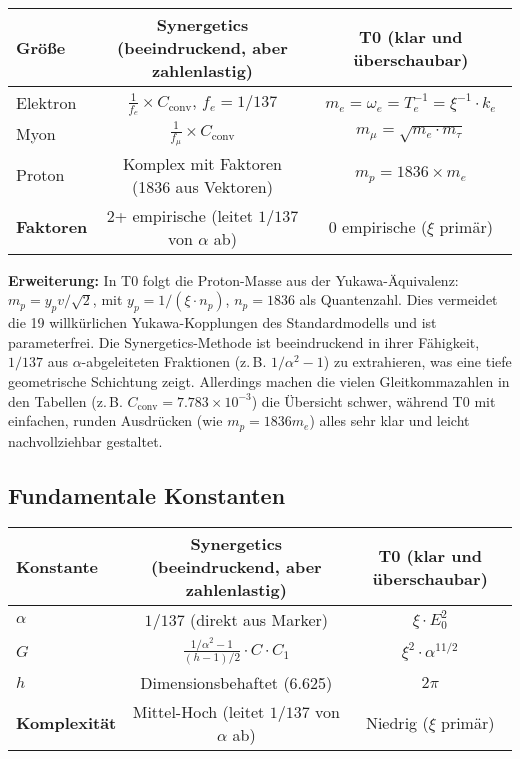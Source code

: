 \documentclass[12pt,a4paper]{article}
\newcommand{\xipar}{\xi}
\begin{document}
	\begin{center}
		\begin{tabular}{lcc}
			\toprule
			\textbf{Größe} & \textbf{Synergetics (beeindruckend, aber zahlenlastig)} & \textbf{T0 (klar und überschaubar)} \\
			\midrule
			Elektron & $\frac{1}{f_e} \times C_{\text{conv}}$, $f_e=1/137$ & $m_e = \omega_e = T_e^{-1} = \xipar^{-1} \cdot k_e$ \\
			Myon & $\frac{1}{f_\mu} \times C_{\text{conv}}$ & $m_\mu = \sqrt{m_e \cdot m_\tau}$ \\
			Proton & Komplex mit Faktoren (1836 aus Vektoren) & $m_p = 1836 \times m_e$ \\
			\midrule
			\textbf{Faktoren} & 2+ empirische (leitet $1/137$ von $\alpha$ ab) & 0 empirische ($\xipar$ primär) \\
			\bottomrule
		\end{tabular}
	\end{center}
	
	\textbf{Erweiterung:} In T0 folgt die Proton-Masse aus der Yukawa-Äquivalenz: $m_p = y_p v / \sqrt{2}$, mit $y_p = 1 / (\xipar \cdot n_p)$, $n_p = 1836$ als Quantenzahl. Dies vermeidet die 19 willkürlichen Yukawa-Kopplungen des Standardmodells und ist parameterfrei. Die Synergetics-Methode ist beeindruckend in ihrer Fähigkeit, $1/137$ aus $\alpha$-abgeleiteten Fraktionen (z.\,B. $1/\alpha^2 - 1$) zu extrahieren, was eine tiefe geometrische Schichtung zeigt. Allerdings machen die vielen Gleitkommazahlen in den Tabellen (z.\,B. $C_{\text{conv}} = 7.783 \times 10^{-3}$) die Übersicht schwer, während T0 mit einfachen, runden Ausdrücken (wie $m_p = 1836 m_e$) alles sehr klar und leicht nachvollziehbar gestaltet.
	
	\subsection{Fundamentale Konstanten}
	
	\begin{center}
		\begin{tabular}{lcc}
			\toprule
			\textbf{Konstante} & \textbf{Synergetics (beeindruckend, aber zahlenlastig)} & \textbf{T0 (klar und überschaubar)} \\
			\midrule
			$\alpha$ & $1/137$ (direkt aus Marker) & $\xipar \cdot E_0^2$ \\
			$G$ & $\frac{1/\alpha^2 - 1}{(h - 1)/2} \cdot C \cdot C_1$ & $\xipar^2 \cdot \alpha^{11/2}$ \\
			$h$ & Dimensionsbehaftet (6.625) & $2\pi$ \\
			\midrule
			\textbf{Komplexität} & Mittel-Hoch (leitet $1/137$ von $\alpha$ ab) & Niedrig ($\xipar$ primär) \\
			\bottomrule
		\end{tabular}
	\end{center}
	
\end{document}
